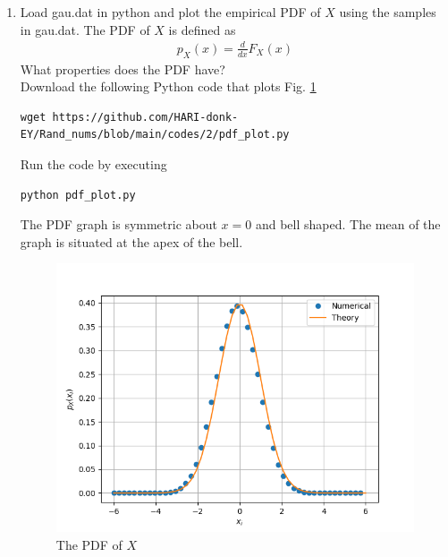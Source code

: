 \documentclass[journal,12pt,twocolumn]{IEEEtran}
\renewcommand\thesection{\arabic{section}}
\begin{document}
\begin{enumerate}[label=\thesection.\arabic*
,ref=\thesection.\theenumi]
Properties of this CDF are:
\begin{itemize}
	\item $F_{Z}(x)=P(Z \leq x)= 1-Q(x) $
    \item $\lim \limits_{x\rightarrow \infty} F_{Z}(x)=1, \hspace{5pt} \lim \limits_{x\rightarrow -\infty} F_{Z}(x)=0$
    \item  $F_{Z}(0)=\frac{1}{2}$
    \item  $F_{Z}(-x)=1-F_{Z}(x)$\\
\end{itemize}

\item
Load gau.dat in python and plot the empirical PDF of $X$ using the samples in gau.dat. The PDF of $X$ is defined as
\begin{align}
p_{X}(x) = \frac{d}{dx}F_{X}(x)
\end{align}
What properties does the PDF have?
\\
\solution Download the following Python code that plots Fig. \ref{fig:gauss_pdf}
\begin{lstlisting}
wget https://github.com/HARI-donk-EY/Rand_nums/blob/main/codes/2/pdf_plot.py
\end{lstlisting}
Run the code by executing
\begin{lstlisting}
python pdf_plot.py
\end{lstlisting}

The PDF graph is symmetric about $x=0$ and bell shaped. The mean of the graph is situated at the apex of the bell.\\

\begin{figure}
\centering
\includegraphics[width=\columnwidth]{./codes/2/fig/gauss_pdf.png}
\caption{The PDF of $X$}
\label{fig:gauss_pdf}
\end{figure}


\end{enumerate}
\end{document}
